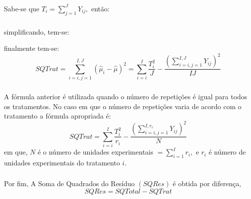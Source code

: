 \documentclass[14pt,aspectratio=1610]{beamer}
\begin{document}
\begin{frame}{}
\frametitle{}
\begin{block}{}
\justifying
Sabe-se que $T_{i}={\displaystyle \sum_{j=1}^{J}Y_{ij}},$ então:

\begin{center}
\end{center}
\end{block}
\end{frame}

\begin{frame}{}
\frametitle{}
\begin{block}{}
\justifying
simplificando, tem-se:
\begin{center}
\end{center}
finalmente tem-se:
$$
SQTrat={\displaystyle \sum_{i=i,j=1}^{I,J}(\hat{\mu}_{i}-\hat{\mu})^{2}}=
{\displaystyle \sum_{i=i}^{I}\dfrac{T_{i}^{2}}{J}-\dfrac{\left({\displaystyle \sum_{i=i,j=1}^{I,J}Y_{ij}}\right)^{2}}{IJ}}
$$
\end{block}
\end{frame}

\begin{frame}{}
\frametitle{}
\begin{block}{}
\justifying
A fórmula anterior é utilizada quando o número de repetições é igual para todos os
tratamentos. No caso em que o número de repetições varia de acordo com o tratamento a
fórmula apropriada é:
$$
SQTrat=
{\displaystyle \sum_{i=i}^{I}\dfrac{T_{i}^{2}}{r_{i}}-\dfrac{\left({\displaystyle \sum_{i=i,j=1}^{I,r_{i}}Y_{ij}}\right)^{2}}{N}}
$$
em que, $N$ é o número de unidades experimentais $={\displaystyle \sum_{i=1}^{I}r_{i}},$ e $r_{i}$ é número de unidades experimentais do tratamento $i.$
\end{block}
\end{frame}

\begin{frame}{}
\frametitle{}
\begin{block}{}
\justifying
Por fim, A Soma de Quadrados do Resíduo $(SQRes)$ é obtida por diferença,
$$SQRes=SQTotal-SQTrat$$
\end{block}
\end{frame}
\end{document}
